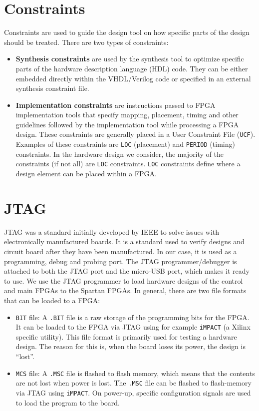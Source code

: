 \section{Constraints}
Constraints are used to guide the design tool on how specific parts of the design should be treated. There are two types of constraints:
%
\begin{itemize}
	\item \textbf{Synthesis constraints} are used by the synthesis tool to optimize specific parts of the hardware description language (HDL) code. 
	They can be either embedded directly within the VHDL/Verilog code or specified in an external synthesis constraint file.
	
	\item \textbf{Implementation constraints} are instructions passed to FPGA implementation tools that specify mapping, placement, timing and other guidelines followed by the implementation tool while processing a FPGA design. These constraints are generally placed in a User Constraint File (\texttt{UCF}). Examples of these constraints are \texttt{LOC} (placement) and \texttt{PERIOD} (timing) constraints. In the hardware design we consider, the majority of the constraints (if not all) are \texttt{LOC} constraints. \texttt{LOC} constraints define where a design element can be placed within a FPGA. 
\end{itemize}
%

\section{JTAG}
JTAG was a standard initially developed by IEEE to solve issues with electronically manufactured boards. 
It is a standard used to verify designs and circuit board after they have been manufactured.
In our case, it is used as a programming, debug and probing port. 
The JTAG programmer/debugger is attached to both the JTAG port and the micro-USB port, which makes it ready to use. 
We use the JTAG programmer to load hardware designs of the control and main FPGAs to the Spartan FPGAs.
In general, there are two file formats that can be loaded to a FPGA:
%
\begin{itemize}
	\item \texttt{BIT} file: A \texttt{.BIT} file is a raw storage of the programming bits for the FPGA.
	It can be loaded to the FPGA via JTAG using for example \texttt{iMPACT} (a Xilinx specific utility).
	This file format is primarily used for testing a hardware design. The reason for this is, when the board loses its power, the design is ``lost''.
	
	\item \texttt{MCS} file: A \texttt{.MSC} file is flashed to flash memory, which means that the contents are not lost when power is lost. The \texttt{.MSC} file can be flashed to flash-memory via JTAG using \texttt{iMPACT}. On power-up, specific configuration signals are used to load the program to the board.
\end{itemize}
%













